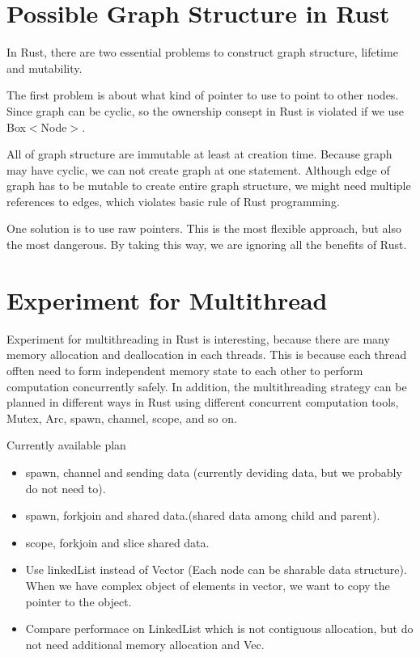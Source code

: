 \section{Possible Graph Structure in Rust}
\label{sec:history}
In Rust, there are two essential problems to construct graph structure, lifetime and mutability. 

The first problem is about what kind of pointer to use to point to other nodes. 
Since graph can be cyclic, so the ownership consept in Rust is violated if we use Box$<$Node$>$.

All of graph structure are immutable at least at creation time. Because graph may have cyclic, 
we can not create graph at one statement. Although edge of graph has to be mutable to create entire graph structure, 
we might need multiple references to edges, which violates basic rule of Rust programming.

One solution is to use raw pointers. This is the most flexible approach, but also the most dangerous. 
By taking this way, we are ignoring all the benefits of Rust.

\section{Experiment for Multithread}
\label{sec:history}
Experiment for multithreading in Rust is interesting, because there are many memory allocation and deallocation in each threads.
This is because each thread offten need to form independent memory state to each other to perform computation concurrently safely.
In addition, the multithreading strategy can be planned in different ways in Rust using different concurrent computation tools, 
Mutex, Arc, spawn, channel, scope, and so on.

Currently available plan
\begin{itemize}
    \item spawn, channel and sending data (currently deviding data, but we probably do not need to).
    \item spawn, forkjoin and shared data.(shared data among child and parent).
    \item scope, forkjoin and slice shared data.
    \item Use linkedList instead of Vector (Each node can be sharable data structure). When we have complex object of elements in vector, we want to copy the pointer to the object.
    \item Compare performace on LinkedList which is not contiguous allocation, but do not need additional memory allocation and Vec.
\end{itemize}



